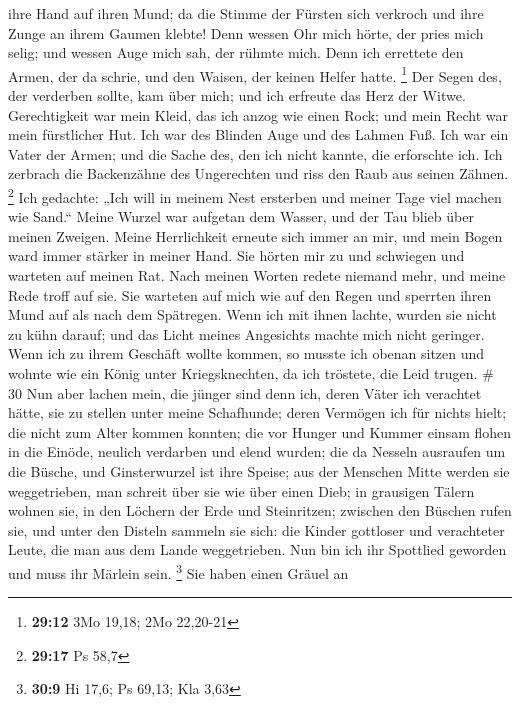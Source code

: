 ihre Hand auf ihren Mund;  da die Stimme der Fürsten sich
verkroch und ihre Zunge an ihrem Gaumen klebte!  Denn
wessen Ohr mich hörte, der pries mich selig; und wessen Auge mich sah,
der rühmte mich.  Denn ich errettete den Armen, der da
schrie, und den Waisen, der keinen Helfer hatte. \footnote{\textbf{29:12}
  3Mo 19,18; 2Mo 22,20-21}  Der Segen des, der verderben
sollte, kam über mich; und ich erfreute das Herz der Witwe.
 Gerechtigkeit war mein Kleid, das ich anzog wie einen
Rock; und mein Recht war mein fürstlicher Hut.  Ich war des
Blinden Auge und des Lahmen Fuß.  Ich war ein Vater der
Armen; und die Sache des, den ich nicht kannte, die erforschte ich.
 Ich zerbrach die Backenzähne des Ungerechten und riss den
Raub aus seinen Zähnen. \footnote{\textbf{29:17} Ps 58,7} 
Ich gedachte: „Ich will in meinem Nest ersterben und meiner Tage viel
machen wie Sand.``  Meine Wurzel war aufgetan dem Wasser,
und der Tau blieb über meinen Zweigen.  Meine Herrlichkeit
erneute sich immer an mir, und mein Bogen ward immer stärker in meiner
Hand.  Sie hörten mir zu und schwiegen und warteten auf
meinen Rat.  Nach meinen Worten redete niemand mehr, und
meine Rede troff auf sie.  Sie warteten auf mich wie auf
den Regen und sperrten ihren Mund auf als nach dem Spätregen.
 Wenn ich mit ihnen lachte, wurden sie nicht zu kühn
darauf; und das Licht meines Angesichts machte mich nicht geringer.
 Wenn ich zu ihrem Geschäft wollte kommen, so musste ich
obenan sitzen und wohnte wie ein König unter Kriegsknechten, da ich
tröstete, die Leid trugen. \# 30  Nun aber lachen mein, die
jünger sind denn ich, deren Väter ich verachtet hätte, sie zu stellen
unter meine Schafhunde;  deren Vermögen ich für nichts
hielt; die nicht zum Alter kommen konnten;  die vor Hunger
und Kummer einsam flohen in die Einöde, neulich verdarben und elend
wurden;  die da Nesseln ausraufen um die Büsche, und
Ginsterwurzel ist ihre Speise;  aus der Menschen Mitte
werden sie weggetrieben, man schreit über sie wie über einen Dieb;
 in grausigen Tälern wohnen sie, in den Löchern der Erde und
Steinritzen;  zwischen den Büschen rufen sie, und unter den
Disteln sammeln sie sich:  die Kinder gottloser und
verachteter Leute, die man aus dem Lande weggetrieben.  Nun
bin ich ihr Spottlied geworden und muss ihr Märlein sein. \footnote{\textbf{30:9}
  Hi 17,6; Ps 69,13; Kla 3,63}  Sie haben einen Gräuel an

